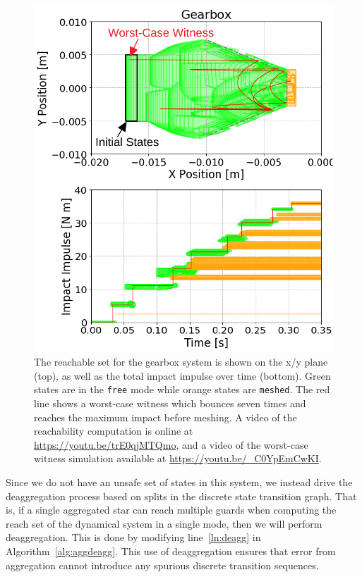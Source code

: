 \begin{figure}[t]
\begin{minipage}{0.48\textwidth}
\label{fig:gearbox_sim}
\end{minipage}
\hspace{1em}
\begin{minipage}{0.48\textwidth}
\centerline{\includegraphics[width=0.98\columnwidth]{images/gearbox_annotated}}
\caption{{ The reachable set for the gearbox system is shown on the x/y plane (top), as well as the total impact impulse over time (bottom).
%
Green states are in the \texttt{free} mode while orange states are \texttt{meshed}.
%
The red line shows a worst-case witness which bounces seven times and reaches the maximum impact before meshing.
%
A video of the reachability computation is online at \url{https://youtu.be/trE0qjMTQmo}, and a video of the worst-case witness
simulation available at \url{https://youtu.be/_C0YpEmCwKI}.}}
\label{fig:gearbox_reach}
\end{minipage}
\end{figure}

Since we do not have an unsafe set of states in this system, we instead drive the deaggregation process based on splits in the discrete state
transition graph.
%
That is, if a single aggregated star can reach multiple guards when computing the reach set of the dynamical system in a single mode, then we will
perform deaggregation.
%
This is done by modifying line~\ref{ln:deagg} in Algorithm~\ref{alg:aggdeagg}.
%
This use of deaggregation ensures that error from aggregation cannot introduce any spurious discrete transition sequences.

